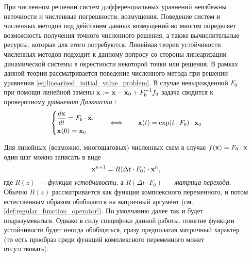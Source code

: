 При численном решении систем дифференциальных уравнений неизбежны неточности и численные погрешности, возмущения.
Поведение систем и численных методов под действием данных возмущений во многом определяет возможность получения точного численного решения,
а также вычислительные ресурсы, которые для этого потребуются.
Линейная теория устойчивости численных методов подходит к данному вопросу со стороны линеаризации динамической системы в окрестности некоторой точки или решения.
В рамках данной теории рассматривается поведение численного метода при решении уравнения \eqref{eq:linearized_initial_value_problem}.
В случае невырожденной $ F_0 $ при помощи линейной замены $ \mathbf{x} := \mathbf{x} - \mathbf{x}_0 + F_0^{-1} f_0 $ задача сводится к проверочному \emph{уравнению Далквиста} \cite{dahlquist1963special}:
%
\begin{equation}
    \label{eq:Dahlquist_equation}
    \begin{dcases}
        \dfrac{d \mathbf{x}}{d t} = F_0 \cdot \mathbf{x}, \\
        \mathbf{x}(0) = \mathbf{x}_0
    \end{dcases}
    \qquad
    \Longleftrightarrow
    \qquad
    \mathbf{x}(t) = \exp(t \cdot F_0) \cdot \mathbf{x}_0
\end{equation}

Для линейных (возможно, многошаговых) численных схем в случае $ f(\mathbf{x}) = F_0 \cdot \mathbf{x} $ один шаг можно записать в виде
%
\begin{equation}
    \label{eq:stability_function}
    \mathbf{x}^{n+1} = R(\Delta t \cdot F_0) \cdot \mathbf{x}^n,
\end{equation}
%
где $ R(z) $~--- \emph{функция устойчивости}, а $ R(\Delta t \cdot F_0) $~--- \emph{матрица перехода}.
Обычно $ R(z) $ рассматривается как функция комплексного переменного, и потом естественным образом обобщается на матричный аргумент
(см. \ref{def:regular_function_operator}).
По умолчанию далее так и будет подразумеваться.
Однако в силу специфики данной работы, понятие функции устойчивости будет иногда обобщаться, сразу предполагая матричный характер
(то есть прообраз среди функций комплексного переменного может отсутствовать).

